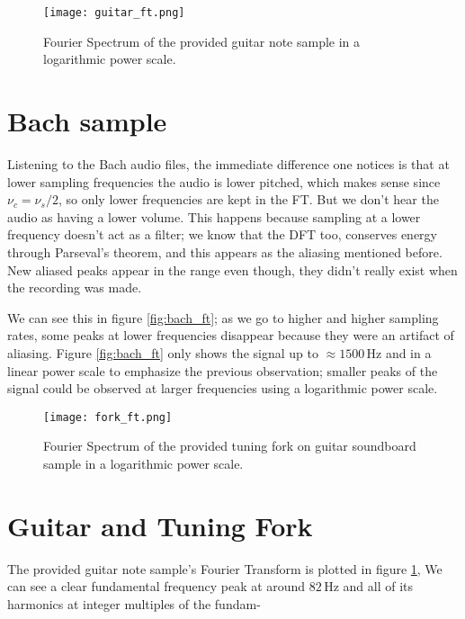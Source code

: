 \documentclass[10pt,a4paper,twocolumn]{article}
\begin{document}
\begin{figure}
\centering
\captionsetup{justification=centering}
\texttt{[image: guitar\_ft.png]}
\caption{Fourier Spectrum of the provided guitar note sample in a logarithmic power scale.}
\label{fig:guitar_ft}
\end{figure}

\section{Bach sample}

Listening to the Bach audio files, the immediate difference one notices is that at lower sampling frequencies the audio is lower pitched, which makes sense since $\nu_c = \nu_s/2$, so only lower frequencies are kept in the FT. But we don't hear the audio as having a lower volume. This happens because sampling at a lower frequency doesn't act as a filter; we know that the DFT too, conserves energy through Parseval's theorem, and this appears as the aliasing mentioned before. New aliased peaks appear in the range even though, they didn't really exist when the recording was made.

We can see this in figure \ref{fig:bach_ft}; as we go to higher and higher sampling rates, some peaks at lower frequencies disappear because they were an artifact of aliasing. Figure \ref{fig:bach_ft} only shows the signal up to $\approx 1500 \, \mathrm{Hz}$ and in a linear power scale to emphasize the previous observation; smaller peaks of the signal could be observed at larger frequencies using a logarithmic power scale.

\begin{figure}
\centering
\captionsetup{justification=centering}
\texttt{[image: fork\_ft.png]}
\caption{Fourier Spectrum of the provided tuning fork on guitar soundboard sample in a logarithmic power scale.}
\label{fig:fork_ft}
\end{figure}


\section{Guitar and Tuning Fork}



The provided guitar note sample's Fourier Transform is plotted in figure \ref{fig:guitar_ft}, We can see a clear fundamental frequency peak at around $82 \,\mathrm{Hz}$ and all of its harmonics at integer multiples of the fundam-
\end{document}
